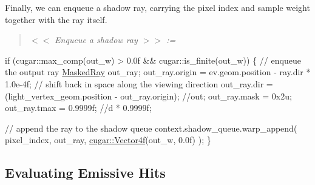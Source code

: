 \begin{DoxyParagraph}{}
Finally, we can enqueue a shadow ray, carrying the pixel index and sample weight together with the ray itself. ~\newline
\label{_hello_renderer_page_Enqueue_a_shadow_ray_anchor}%
%
 \begin{quote}
{\itshape  $<$$<$ Enqueue a shadow ray $>$$>$ \+:= }

\end{quote}

\begin{DoxyCode}
\textcolor{keywordflow}{if} (cugar::max\_comp(out\_w) > 0.0f && cugar::is\_finite(out\_w))
\{
    \textcolor{comment}{// enqueue the output ray}
    \hyperlink{struct_masked_ray}{MaskedRay} out\_ray;
    out\_ray.origin   = ev.geom.position - ray.dir * 1.0e-4f; \textcolor{comment}{// shift back in space along the viewing
       direction}
    out\_ray.dir      = (light\_vertex\_geom.position - out\_ray.origin); \textcolor{comment}{//out;}
    out\_ray.mask     = 0x2u;
    out\_ray.tmax     = 0.9999f; \textcolor{comment}{//d * 0.9999f;}
    
    \textcolor{comment}{// append the ray to the shadow queue}
    context.shadow\_queue.warp\_append( pixel\_index, out\_ray, \hyperlink{structcugar_1_1_vector}{cugar::Vector4f}(out\_w, 0.0f) );
\}
\end{DoxyCode}

\end{DoxyParagraph}
\hypertarget{_hello_renderer_page_EvaluatingEmissiveHitsSection}{}\subsection{Evaluating Emissive Hits}\label{_hello_renderer_page_EvaluatingEmissiveHitsSection}
